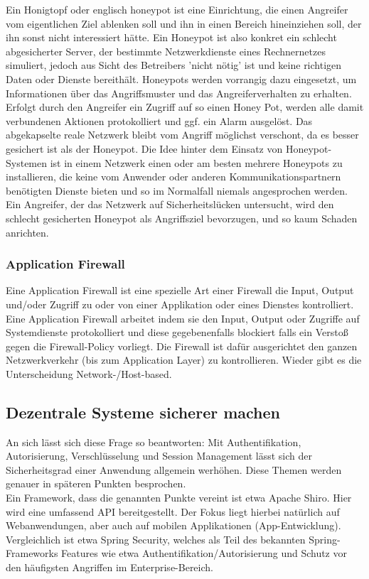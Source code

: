 \documentclass[letterpaper, 12pt]{article}
\let\tempsubsection\subsection
\renewcommand\subsection[1]{\vspace{0cm}\tempsubsection{#1}\vspace{0cm}}
\let\tempsubsubsection\subsubsection
\renewcommand\subsubsection[1]{\vspace{0cm}\tempsubsubsection{#1}\vspace{0cm}}
\begin{document}
Ein Honigtopf oder englisch honeypot ist eine Einrichtung, die einen Angreifer vom
eigentlichen Ziel ablenken soll und ihn in einen Bereich hineinziehen soll, der ihn sonst
nicht interessiert hätte. Ein Honeypot ist also
konkret ein schlecht abgesicherter Server, der bestimmte Netzwerkdienste eines Rechnernetzes simuliert, jedoch aus Sicht des Betreibers 'nicht nötig' ist und keine richtigen Daten oder Dienste bereithält. Honeypots werden vorrangig dazu eingesetzt, um Informationen
über das Angriffsmuster und das Angreiferverhalten zu erhalten. Erfolgt durch
den Angreifer ein Zugriff auf so einen Honey Pot, werden alle damit verbundenen Aktionen
protokolliert und ggf. ein Alarm ausgelöst. Das abgekapselte reale Netzwerk
bleibt vom Angriff möglichst verschont, da es besser gesichert ist als der Honeypot. Die Idee hinter dem Einsatz von Honeypot-Systemen ist in einem Netzwerk einen
oder am besten mehrere Honeypots zu installieren, die keine vom Anwender oder anderen
Kommunikationspartnern benötigten Dienste bieten und so im Normalfall niemals
angesprochen werden. Ein Angreifer, der das Netzwerk auf Sicherheitslücken untersucht, wird den schlecht gesicherten Honeypot als Angriffsziel bevorzugen, und so kaum Schaden anrichten. \cite{ausarbeitungsec}

\subsubsection{Application Firewall}

Eine Application Firewall ist eine spezielle Art einer Firewall die Input, Output und/oder
Zugriff zu oder von einer Applikation oder eines Dienstes kontrolliert. Eine Application
Firewall arbeitet indem sie den Input, Output oder Zugriffe auf Systemdienste protokolliert
und diese gegebenenfalls blockiert falls ein Verstoß gegen die Firewall-Policy
vorliegt. Die Firewall ist dafür ausgerichtet den ganzen Netzwerkverkehr (bis zum Application
Layer) zu kontrollieren. Wieder gibt es die Unterscheidung Network-/Host-based. \cite{ausarbeitungsec}

\subsection{Dezentrale Systeme sicherer machen}

An sich lässt sich diese Frage so beantworten: Mit Authentifikation, Autorisierung, Verschlüsselung und Session Management lässt sich der Sicherheitsgrad einer Anwendung allgemein werhöhen. Diese Themen werden genauer in späteren Punkten besprochen. \\
Ein Framework, dass die genannten Punkte vereint ist etwa Apache Shiro. Hier wird eine umfassend API bereitgestellt. Der Fokus liegt hierbei natürlich auf Webanwendungen, aber auch auf mobilen Applikationen (App-Entwicklung). Vergleichlich ist etwa Spring Security, welches als Teil des bekannten Spring-Frameworks Features wie etwa Authentifikation/Autorisierung und Schutz vor den häufigsten Angriffen im Enterprise-Bereich.
\end{document}
